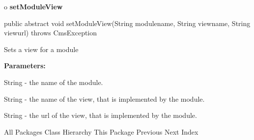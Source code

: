 o {\bf setModuleView} 

\begin{PRE}
 public abstract void setModuleView(String modulename,
                                    String viewname,
                                    String viewurl) throws CmsException
\end{PRE}

\begin{description}
\htmlDD Sets a view for a module 

\begin{description}
\item {\bf Parameters:}  

String - the name of the module.  

String - the name of the view, that is implemented by the module.  

String - the url of the view, that is implemented by the module.  
\end{description}

\end{description}

\htmlHR

\begin{PRE}
All Packages  Class Hierarchy  This Package  Previous  Next  Index
\end{PRE}


